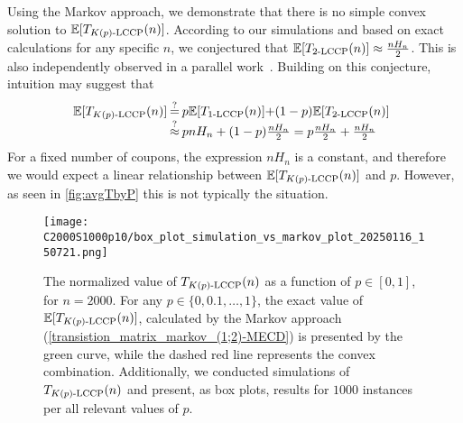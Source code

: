 Using the Markov approach,
we demonstrate that there is no simple convex solution to $\E[\T{\fmecd{K(p)}{}{n}}{n}]$.
According to our simulations and based on exact calculations for any specific $n$,
we conjectured that $\E[\T{\kecd{2}{n}}{n}] \approx \frac{n H_n}{2}$.
This is also independently observed in a parallel work~\cite{barlev2024}.
\label{NoSimpleConvexSolution}
Building on this conjecture, intuition may suggest that
        \[\begin{array}{lcl}
        \hspace{-0.16cm}
        \E[\T{\fmecd{K(p)}{}{n}}{n}] 
        &\hspace{-0.28cm}\stackrel{?}{=}&
        \hspace{-0.28cm}p \E[\T{\kecd{1}{n}}{n}] \hspace{-0.08cm} + \hspace{-0.08cm} (1-p) \E[\T{\kecd{2}{n}}{n}] 
        \\&\hspace{-0.28cm}\stackrel{?}{\approx}&
        \hspace{-0.28cm}p nH_n + (1-p) \frac{n H_n}{2}
        =
        p \frac{nH_n}{2}+\frac{nH_n}{2}
        \end{array}\]
    For a fixed number of coupons, the expression $nH_n$ is a constant, and therefore we would expect a linear relationship between $\E[\T{\fmecd{K(p)}{}{n}}{n}]$ and $p$. 
    However, as seen in \autoref{fig:avgTbyP} this is not typically the situation.
    \begin{figure}[t]
    \centering
    \vspace{-2.6ex}
    \texttt{[image: C2000S1000p10/box\_plot\_simulation\_vs\_markov\_plot\_20250116\_150721.png]}
    \caption{\footnotesize The normalized value of $\T{\fmecd{K(p)}{}{n}}{n}$ as a function of $p\in[0,1]$, for $n=2000$. %
    For any $p \in \{0,0.1,\ldots,1\}$, the exact value of $\E[\T{\fmecd{K(p)}{}{n}}{n}]$, 
    calculated by the Markov approach (\autoref{transistion_matrix_markov_(1;2)-MECD})
    is presented by the green curve, 
    while the dashed red line represents the convex combination.
    Additionally, we conducted simulations of $\T{\fmecd{K(p)}{}{n}}{n}$ and present, as box plots, results for $1000$ instances per all relevant values of $p$.\vspace{-4.5ex}}
    \label{fig:avgTbyP}
    \end{figure}
